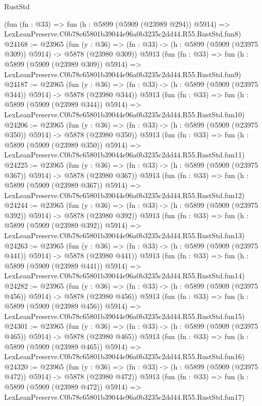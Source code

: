 \begin{lexlean}{RustStd}
\begin{coremodule}
{{    (fun (fn : @33) =>
    fun (h : @5899 (@5909 (@23989 @294)) @5914) =>
    LexLeanPreserve.C0b78c65801b39044e96a0b3235c2dd44.R55.RustStd.fun8)
@24168 := @23965
    (fun (y : @36) => (fn : @33) -> (h : @5899 (@5909 (@23975 @309)) @5914) -> @5878 (@23980 @309))
    @5913
    (fun (fn : @33) =>
    fun (h : @5899 (@5909 (@23989 @309)) @5914) =>
    LexLeanPreserve.C0b78c65801b39044e96a0b3235c2dd44.R55.RustStd.fun9)
@24187 := @23965
    (fun (y : @36) => (fn : @33) -> (h : @5899 (@5909 (@23975 @344)) @5914) -> @5878 (@23980 @344))
    @5913
    (fun (fn : @33) =>
    fun (h : @5899 (@5909 (@23989 @344)) @5914) =>
    LexLeanPreserve.C0b78c65801b39044e96a0b3235c2dd44.R55.RustStd.fun10)
@24206 := @23965
    (fun (y : @36) => (fn : @33) -> (h : @5899 (@5909 (@23975 @350)) @5914) -> @5878 (@23980 @350))
    @5913
    (fun (fn : @33) =>
    fun (h : @5899 (@5909 (@23989 @350)) @5914) =>
    LexLeanPreserve.C0b78c65801b39044e96a0b3235c2dd44.R55.RustStd.fun11)
@24225 := @23965
    (fun (y : @36) => (fn : @33) -> (h : @5899 (@5909 (@23975 @367)) @5914) -> @5878 (@23980 @367))
    @5913
    (fun (fn : @33) =>
    fun (h : @5899 (@5909 (@23989 @367)) @5914) =>
    LexLeanPreserve.C0b78c65801b39044e96a0b3235c2dd44.R55.RustStd.fun12)
@24244 := @23965
    (fun (y : @36) => (fn : @33) -> (h : @5899 (@5909 (@23975 @392)) @5914) -> @5878 (@23980 @392))
    @5913
    (fun (fn : @33) =>
    fun (h : @5899 (@5909 (@23989 @392)) @5914) =>
    LexLeanPreserve.C0b78c65801b39044e96a0b3235c2dd44.R55.RustStd.fun13)
@24263 := @23965
    (fun (y : @36) => (fn : @33) -> (h : @5899 (@5909 (@23975 @441)) @5914) -> @5878 (@23980 @441))
    @5913
    (fun (fn : @33) =>
    fun (h : @5899 (@5909 (@23989 @441)) @5914) =>
    LexLeanPreserve.C0b78c65801b39044e96a0b3235c2dd44.R55.RustStd.fun14)
@24282 := @23965
    (fun (y : @36) => (fn : @33) -> (h : @5899 (@5909 (@23975 @456)) @5914) -> @5878 (@23980 @456))
    @5913
    (fun (fn : @33) =>
    fun (h : @5899 (@5909 (@23989 @456)) @5914) =>
    LexLeanPreserve.C0b78c65801b39044e96a0b3235c2dd44.R55.RustStd.fun15)
@24301 := @23965
    (fun (y : @36) => (fn : @33) -> (h : @5899 (@5909 (@23975 @465)) @5914) -> @5878 (@23980 @465))
    @5913
    (fun (fn : @33) =>
    fun (h : @5899 (@5909 (@23989 @465)) @5914) =>
    LexLeanPreserve.C0b78c65801b39044e96a0b3235c2dd44.R55.RustStd.fun16)
@24320 := @23965
    (fun (y : @36) => (fn : @33) -> (h : @5899 (@5909 (@23975 @472)) @5914) -> @5878 (@23980 @472))
    @5913
    (fun (fn : @33) =>
    fun (h : @5899 (@5909 (@23989 @472)) @5914) =>
    LexLeanPreserve.C0b78c65801b39044e96a0b3235c2dd44.R55.RustStd.fun17)
}}
\end{coremodule}
\end{lexlean}
